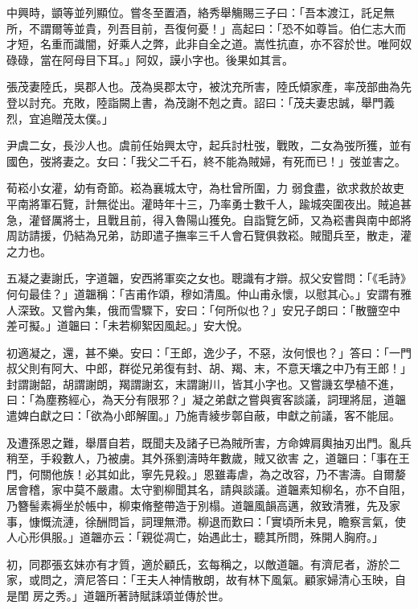 \begin{pinyinscope}
 中興時，顗等並列顯位。嘗冬至置酒，絡秀舉觴賜三子曰：「吾本渡江，託足無所，不謂爾等並貴，列吾目前，吾復何憂！」高起曰：「恐不如尊旨。伯仁志大而才短，名重而識闇，好乘人之弊，此非自全之道。嵩性抗直，亦不容於世。唯阿奴碌碌，當在阿母目下耳。」阿奴，謨小字也。後果如其言。



 張茂妻陸氏，吳郡人也。茂為吳郡太守，被沈充所害，陸氏傾家產，率茂部曲為先登以討充。充敗，陸詣闕上書，為茂謝不剋之責。詔曰：「茂夫妻忠誠，舉門義烈，宜追贈茂太僕。」



 尹虞二女，長沙人也。虞前任始興太守，起兵討杜弢，戰敗，二女為弢所獲，並有國色，弢將妻之。女曰：「我父二千石，終不能為賊婦，有死而已！」弢並害之。



 荀崧小女灌，幼有奇節。崧為襄城太守，為杜曾所圍，力
 弱食盡，欲求救於故吏平南將軍石覽，計無從出。灌時年十三，乃率勇士數千人，踰城突圍夜出。賊追甚急，灌督厲將士，且戰且前，得入魯陽山獲免。自詣覽乞師，又為崧書與南中郎將周訪請援，仍結為兄弟，訪即遣子撫率三千人會石覽俱救崧。賊聞兵至，散走，灌之力也。



 五凝之妻謝氏，字道韞，安西將軍奕之女也。聰識有才辯。叔父安嘗問：「《毛詩》何句最佳？」道韞稱：「吉甫作頌，穆如清風。仲山甫永懷，以慰其心。」安謂有雅人深致。又嘗內集，俄而雪驟下，安曰：「何所似也？」安兄子朗曰：「散鹽空中
 差可擬。」道韞曰：「未若柳絮因風起。」安大悅。



 初適凝之，還，甚不樂。安曰：「王郎，逸少子，不惡，汝何恨也？」答曰：「一門叔父則有阿大、中郎，群從兄弟復有封、胡、羯、末，不意天壤之中乃有王郎！」封謂謝韶，胡謂謝朗，羯謂謝玄，末謂謝川，皆其小字也。又嘗譏玄學植不進，曰：「為塵務經心，為天分有限邪？」凝之弟獻之嘗與賓客談議，詞理將屈，道韞遣婢白獻之曰：「欲為小郎解圍。」乃施青綾步鄣自蔽，申獻之前議，客不能屈。



 及遭孫恩之難，舉厝自若，既聞夫及諸子已為賊所害，方命婢肩輿抽刃出門。亂兵稍至，手殺數人，乃被虜。其外孫劉濤時年數歲，賊又欲害
 之，道韞曰：「事在王門，何關他族！必其如此，寧先見殺。」恩雖毒虐，為之改容，乃不害濤。自爾嫠居會稽，家中莫不嚴肅。太守劉柳聞其名，請與談議。道韞素知柳名，亦不自阻，乃簪髻素褥坐於帳中，柳束脩整帶造于別榻。道韞風韻高邁，敘致清雅，先及家事，慷慨流漣，徐酬問旨，詞理無滯。柳退而歎曰：「實頃所未見，瞻察言氣，使人心形俱服。」道韞亦云：「親從凋亡，始遇此士，聽其所問，殊開人胸府。」



 初，同郡張玄妹亦有才質，適於顧氏，玄每稱之，以敵道韞。有濟尼者，游於二家，或問之，濟尼答曰：「王夫人神情散朗，故有林下風氣。顧家婦清心玉映，自是閨
 房之秀。」道韞所著詩賦誄頌並傳於世。




\end{pinyinscope}
